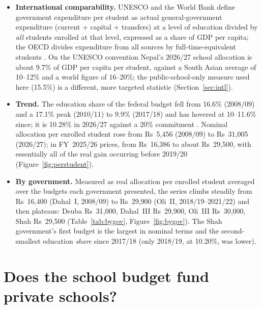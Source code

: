 \documentclass[11pt,a4paper]{article}
\begin{document}
\begin{itemize}[leftmargin=1.4em]
\item \textbf{International comparability.} UNESCO and the World Bank define government expenditure per student as actual general-government expenditure (current + capital + transfers) at a level of education divided by \emph{all} students enrolled at that level, expressed as a share of GDP per capita; the OECD divides expenditure from all sources by full-time-equivalent students \cite{wb_meta_prim,uis_meta,oecd2023}. On the UNESCO convention Nepal's 2026/27 school allocation is about 9.7\% of GDP per capita per student, against a South Asian average of 10--12\% and a world figure of 16--20\%; the public-school-only measure used here (15.5\%) is a different, more targeted statistic (Section~\ref{sec:intl}).
\item \textbf{Trend.} The education share of the federal budget fell from 16.6\% (2008/09) and a 17.1\% peak (2010/11) to 9.9\% (2017/18) and has hovered at 10--11.6\% since; it is 10.28\% in 2026/27 against a 20\% commitment \cite{nce2020,unicef2020,kpedit2026}. Nominal allocation per enrolled student rose from Rs~5,456 (2008/09) to Rs~31,005 (2026/27); in FY~2025/26 prices, from Rs~16,386 to about Rs~29,500, with essentially all of the real gain occurring before 2019/20 (Figure~\ref{fig:perstudent}).
\item \textbf{By government.} Measured as real allocation per enrolled student averaged over the budgets each government presented, the series climbs steadily from Rs~16,400 (Dahal~I, 2008/09) to Rs~29,900 (Oli~II, 2018/19--2021/22) and then plateaus: Deuba Rs~31,000, Dahal~III Rs~29,900, Oli~III Rs~30,000, Shah Rs~29,500 (Table~\ref{tab:bygov}, Figure~\ref{fig:bygov}). The Shah government's first budget is the largest in nominal terms and the second-smallest education \emph{share} since 2017/18 (only 2018/19, at 10.20\%, was lower).
\end{itemize}

\section{Does the school budget fund private schools?}\label{sec:private}
\end{document}
